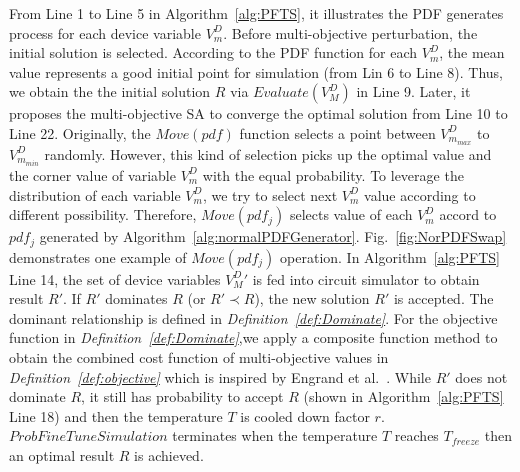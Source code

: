   From Line 1 to Line 5 in Algorithm~\ref{alg:PFTS}, it illustrates the PDF generates process for each device variable $V^D_m$. Before multi-objective perturbation, the initial solution is selected. According to the PDF function for each $V^D_m$, the mean value represents a good initial point for simulation (from Lin 6 to Line 8). Thus, we obtain the the initial solution $R$ via $Evaluate(V^D_M)$ in Line 9. Later, it proposes the multi-objective SA to converge the optimal solution from Line 10 to Line 22. Originally, the $Move(pdf)$ function selects a point between $V^{D}_{m_{max}}$ to $V^{D}_{m_{min}}$ randomly. However, this kind of selection picks up the optimal value and the corner value of variable $V^D_m$ with the equal probability. To leverage the distribution of each variable $V^D_m$, we try to select next $V^D_m$ value according to different possibility. Therefore, $Move(pdf_j)$ selects value of each $V^D_m$ accord to $pdf_j$ generated by Algorithm~\ref{alg:normalPDFGenerator}. Fig.~\ref{fig:NorPDFSwap} demonstrates one example of $Move(pdf_j)$ operation. In Algorithm~\ref{alg:PFTS} Line 14, the set of device variables ${V^D_M}'$ is fed into circuit simulator to obtain result $R'$. If $R'$ dominates $R$ (or $R' \prec R$), the new solution $R'$ is accepted. The dominant relationship is defined in {\it Definition~\ref{def:Dominate}}. For the objective function in {\it Definition~\ref{def:Dominate}},we apply a composite function method to obtain the combined cost function of multi-objective values in {\it Definition~\ref{def:objective}} which is inspired by Engrand et al.~\cite{EngrandMOSA}. While $R'$ does not dominate $R$, it still has probability to accept $R$ (shown in Algorithm~\ref{alg:PFTS} Line 18) and then the temperature $T$ is cooled down factor $r$. $ProbFineTuneSimulation$ terminates when the temperature $T$ reaches $T_{freeze}$ then an optimal result $R$ is achieved.



